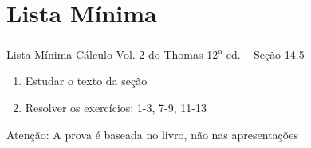 \documentclass[fleqn,utf8,aspectratio=169,12pt]{beamer}
\begin{document}



\section{Lista Mínima}

\begin{frame}{Lista Mínima}
  Cálculo Vol. 2 do Thomas 12\textsuperscript{a} ed. -- Seção 14.5
  \begin{enumerate}
    \item Estudar o texto da seção
    \item Resolver os exercícios: 1-3, 7-9, 11-13
  \end{enumerate}

  \vfill
  Atenção: A prova é baseada no livro, não nas apresentações
\end{frame}

\end{document}
